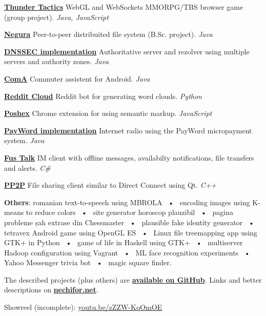 \documentclass[a4wide]{article}
\newcommand{\uses}[1]{\emph{\color[rgb]{0.35, 0.35, 0.35} #1}}
\newcommand{\sep}{~•~}
\newcommand{\longDesc}[4]{\href{#4}{\bf #1} #3 \uses{#2}}
\begin{document}
\longDesc{Thunder Tactics}{Java, JavaScript}{WebGL and WebSockets MMORPG/TBS
browser game (group project).}{https://github.com/paul-nechifor/tt}

\longDesc{Negura}{Java}{Peer-to-peer distribuited file system (B.Sc.
project).}{https://github.com/paul-nechifor/negura}

\longDesc{DNSSEC implementation}{Java}{Authoritative server and rezolver using
multiple servers and authority
zones.}{https://github.com/paul-nechifor/dnssec-toy}

\longDesc{ComA}{Java}{Commuter assistent for
Android.}{https://github.com/paul-nechifor/coma}

\longDesc{Reddit Cloud}{Python}{Reddit bot for generating word
clouds.}{https://github.com/paul-nechifor/reddit-cloud}

\longDesc{Poshex}{JavaScript}{Chrome extension for using semantic
markup.}{https://github.com/paul-nechifor/poshex}

\longDesc{PayWord implementation}{Java}{Internet radio using the PayWord
micropayment system. }{https://github.com/paul-nechifor/payword-radio}

\longDesc{Fus Talk}{C\#}{IM client with offline messages, availabilty
notifications, file transfers and
alerts.}{https://github.com/paul-nechifor/fus-talk}

\longDesc{PP2P}{C++}{File sharing client similar to Direct Connect using
Qt.}{https://github.com/paul-nechifor/pp2p}

\vspace{5mm}

\textbf{Others}:
romanian text-to-speech using MBROLA
\sep{} encoding images using K-means to reduce colors
\sep{} site generator horoscop plauzibil
\sep{} pagina probleme șah extrase din Chessmaster
\sep{} plausible fake identity generator
\sep{} tetravex Android game using OpenGL ES
\sep{} Linux file treemapping app using GTK+ in Python
\sep{} game of life in Haskell using GTK+
\sep{} multiserver Hadoop configuration using Vagrant
\sep{} ML face recognition experiments
\sep{} Yahoo Messenger trivia bot
\sep{} magic square finder.

\vspace{5mm}

The described projects (plus others) are
\href{http://github.com/paul-nechifor}{\textbf{available on GitHub}}. Links and
better descriptions on \href{http://nechifor.net}{\textbf{nechifor.net}}.

\vspace{5mm}

Showreel (incomplete): \href{http://youtu.be/zZZW-KqOmOE}{youtu.be/zZZW-KqOmOE}
\end{document}
